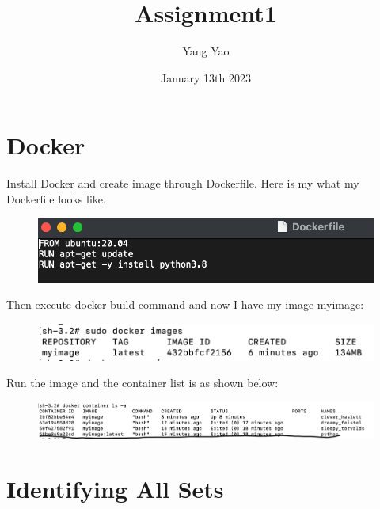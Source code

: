\documentclass{article}
\title{ Assignment1}
\author{Yang Yao }
\date{January 13th 2023}
\begin{document}
\maketitle

\section{Docker}
Install Docker and create image through Dockerfile.
Here is my what my Dockerfile looks like.
\begin{figure}[H]
\centering
\includegraphics{dockerfile}
\end{figure}

\noindent Then execute docker build command and now I have my image myimage:

\begin{figure}[H]
\centering
\includegraphics{images/image-images.png}
\end{figure}



\noindent Run the image and the container list is as shown below:
\begin{figure}[H]
\centering
\includegraphics[width=15cm] {images/image-containers.png}
\end{figure}

\section{Identifying All Sets}
\end{document}
